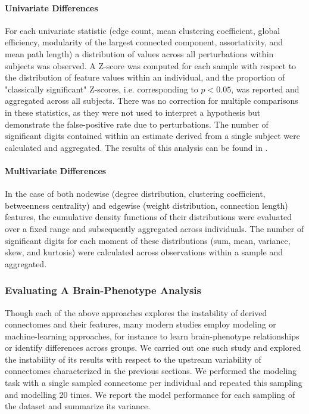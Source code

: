\documentclass[10pt,letterpaper]{article}
\begin{document}
\paragraph{Univariate Differences} For each univariate statistic (edge count, mean
clustering coefficient, global efficiency, modularity of the largest connected
component, assortativity, and mean path length) a distribution of values across all
perturbations within subjects was observed. A Z-score was computed for each sample
with respect to the distribution of feature values within an individual, and the
proportion of "classically significant" Z-scores, i.e. corresponding to $p < 0.05$,
was reported and aggregated across all subjects. There was no correction for
multiple comparisons in these statistics, as they were not used to interpret a
hypothesis but demonstrate the false-positive rate due to perturbations. The number
of significant digits contained within an estimate derived from a single subject
were calculated and aggregated. The results of this analysis can be found in
.

\paragraph{Multivariate Differences} In the case of both nodewise (degree
distribution, clustering coefficient, betweenness centrality) and edgewise (weight
distribution, connection length) features, the cumulative density functions of their
distributions were evaluated over a fixed range and subsequently aggregated across
individuals. The number of significant digits for each moment of these distributions
(sum, mean, variance, skew, and kurtosis) were calculated across observations within
a sample and aggregated.

\subsubsection*{Evaluating A Brain-Phenotype Analysis}
Though each of the above approaches explores the instability of derived connectomes
and their features, many modern studies employ modeling or machine-learning
approaches, for instance to learn brain-phenotype relationships or identify
differences across groups. We carried out one such study and explored the instability 
of its results with respect to the upstream variability of connectomes characterized
in the previous sections. We performed the modeling task with a single sampled
connectome per individual and repeated this sampling and modelling 20 times. We
report the model performance for each sampling of the dataset and summarize its
variance.
\end{document}

